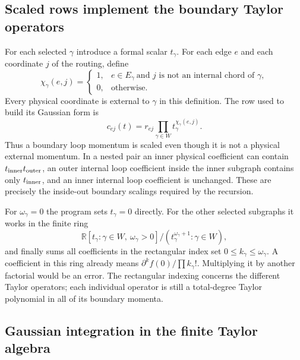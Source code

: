 \subsection{Scaled rows implement the boundary Taylor operators}

For each selected $\gamma$ introduce a formal scalar $t_\gamma$.  For
each edge $e$ and each coordinate $j$ of the routing, define
\[
 \chi_\gamma(e,j)=
 \begin{cases}
 1,&e\in E_\gamma\ \text{and }j\text{ is not an internal chord of }\gamma,\\
 0,&\text{otherwise}.
 \end{cases}
\]
Every physical coordinate is external to $\gamma$ in this definition.
The row used to build its Gaussian form is
\[
 c_{ej}(t)=r_{ej}\prod_{\gamma\in W}
                 t_\gamma^{\chi_\gamma(e,j)}.
\]
Thus a boundary loop momentum is scaled even though it is not a physical
external momentum.  In a nested pair an inner physical coefficient can
contain $t_{\rm inner}t_{\rm outer}$, an outer internal loop coefficient
inside the inner subgraph contains only $t_{\rm inner}$, and an inner
internal loop coefficient is unchanged.  These are precisely the
inside-out boundary scalings required by the recursion.

For $\omega_\gamma=0$ the program sets $t_\gamma=0$ directly.  For the
other selected subgraphs it works in the finite ring
\[
 \mathbb R[t_\gamma:\gamma\in W,\ \omega_\gamma>0]
     /(t_\gamma^{\omega_\gamma+1}:\gamma\in W),
\]
and finally sums all coefficients in the rectangular index set
$0\le k_\gamma\le\omega_\gamma$.  A coefficient in this ring already
means $\partial^k f(0)/\prod k_\gamma!$.  Multiplying it by another
factorial would be an error.  The rectangular indexing concerns the
different Taylor operators; each individual operator is still a
total-degree Taylor polynomial in all of its boundary momenta.

\subsection{Gaussian integration in the finite Taylor algebra}


